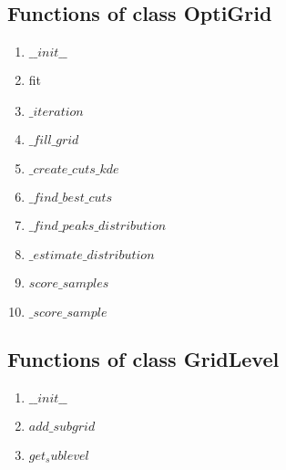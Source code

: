 \subsection{Functions of class OptiGrid}
\begin{enumerate}    
    \item $\_\_init\_\_$\newline{\lipsum[1]}
    \item fit
    \item $\_iteration$
    \item $\_fill\_grid$
    \item $\_create\_cuts\_kde$
    \item $\_find\_best\_cuts$
    \item $\_find\_peaks\_distribution$
    \item $\_estimate\_distribution$
    \item $score\_samples$
    \item $\_score\_sample $
\end{enumerate}

\subsection{Functions of class GridLevel}
\begin{enumerate}    
    \item $\_\_init\_\_$
    \item $add\_subgrid$
    \item $get_sublevel$
\end{enumerate}


